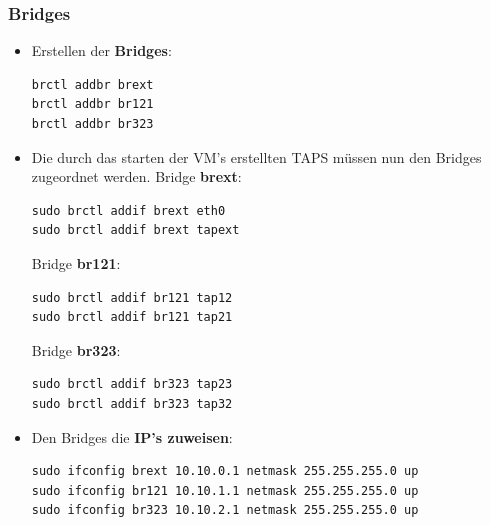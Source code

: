 \documentclass[a4,12pt]{scrartcl}
\begin{document}
\subsubsection{Bridges}
\begin{itemize}
\item Erstellen der \textbf{Bridges}:
\begin{lstlisting}
brctl addbr brext
brctl addbr br121
brctl addbr br323
\end{lstlisting}



\item Die durch das starten der VM's erstellten TAPS müssen nun den Bridges zugeordnet werden.
\newline
Bridge \textbf{brext}:
\begin{lstlisting}
sudo brctl addif brext eth0
sudo brctl addif brext tapext
\end{lstlisting}
Bridge \textbf{br121}:
\begin{lstlisting}
sudo brctl addif br121 tap12
sudo brctl addif br121 tap21
\end{lstlisting}
Bridge \textbf{br323}:
\begin{lstlisting}
sudo brctl addif br323 tap23
sudo brctl addif br323 tap32
\end{lstlisting}


\item Den Bridges die \textbf{IP's zuweisen}:
\begin{lstlisting}
sudo ifconfig brext 10.10.0.1 netmask 255.255.255.0 up
sudo ifconfig br121 10.10.1.1 netmask 255.255.255.0 up
sudo ifconfig br323 10.10.2.1 netmask 255.255.255.0 up
\end{lstlisting}






\end{itemize}
\end{document}
